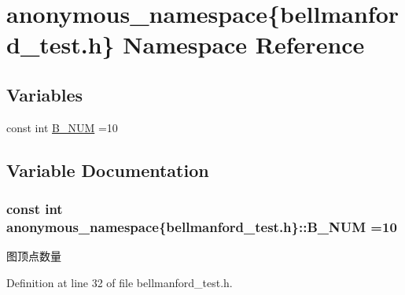 \hypertarget{namespaceanonymous__namespace_02bellmanford__test_8h_03}{}\section{anonymous\+\_\+namespace\{bellmanford\+\_\+test.\+h\} Namespace Reference}
\label{namespaceanonymous__namespace_02bellmanford__test_8h_03}
\subsection*{Variables}
\begin{DoxyCompactItemize}
\item 
const int \hyperlink{namespaceanonymous__namespace_02bellmanford__test_8h_03_a2f96b50fa494ea2335e252edc99f0a48}{B\+\_\+\+N\+U\+M} =10
\end{DoxyCompactItemize}


\subsection{Variable Documentation}
\hypertarget{namespaceanonymous__namespace_02bellmanford__test_8h_03_a2f96b50fa494ea2335e252edc99f0a48}{}
\subsubsection[{B\+\_\+\+N\+U\+M}]{\setlength{\rightskip}{0pt plus 5cm}const int anonymous\+\_\+namespace\{bellmanford\+\_\+test.\+h\}\+::B\+\_\+\+N\+U\+M =10}\label{namespaceanonymous__namespace_02bellmanford__test_8h_03_a2f96b50fa494ea2335e252edc99f0a48}
图顶点数量 

Definition at line 32 of file bellmanford\+\_\+test.\+h.

